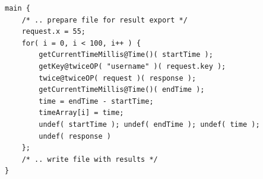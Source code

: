 \documentclass[12pt,a4paper]{article}
\begin{document}
\begin{lstlisting}[caption={Benchmark client},label={lst:benchmarkClient}]
main {                                                                                                                                                                                                       
	/* .. prepare file for result export */
	request.x = 55;                                                                                                                                                                                         
	for( i = 0, i < 100, i++ ) {                                                                                                                                                                            
		getCurrentTimeMillis@Time()( startTime );                                                                                                                                                          
		getKey@twiceOP( "username" )( request.key );                                                                                                                                                       
		twice@twiceOP( request )( response );                                                                                                                                                              
		getCurrentTimeMillis@Time()( endTime );                                                                                                                                                            
		time = endTime - startTime;                                                                                                                                                                        
		timeArray[i] = time;                                                                                                                                                                               
		undef( startTime ); undef( endTime ); undef( time ); 
		undef( response )                                                                                                                                                                                  
	};                                                                                                                                                                                                    
	/* .. write file with results */                                                                                                                                                                                                      
}
\end{lstlisting}
\end{document}
